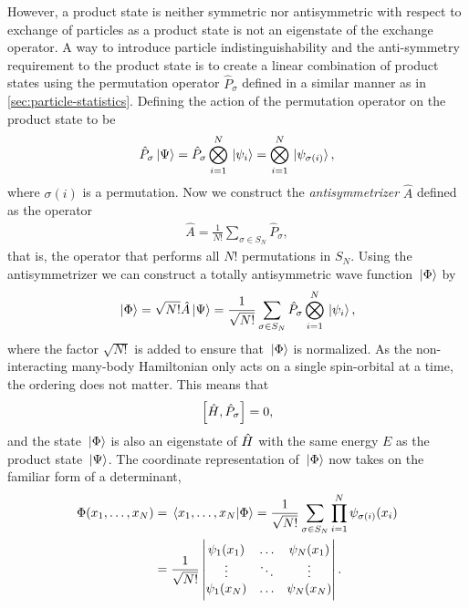         However, a product state is neither symmetric nor antisymmetric with
        respect to exchange of particles as a product state is not an eigenstate
        of the exchange operator.
        A way to introduce particle indistinguishability and the anti-symmetry
        requirement to the product state is to create a linear combination of
        product states using the permutation operator $\hat{P}_{\sigma}$ defined
        in a similar manner as in \autoref{sec:particle-statistics}.
        Defining the action of the permutation operator on the product state to
        be
        \begin{align}
            \hat{P}_{\sigma}\ket*{\Psi}
            = \hat{P}_{\sigma}\bigotimes_{i = 1}^{N}\ket*{\psi_i}
            = \bigotimes_{i = 1}^{N}\ket*{\psi_{\sigma(i)}},
        \end{align}
        where $\sigma(i)$ is a permutation.
        Now we construct the \emph{antisymmetrizer} $\hat{A}$ defined as the
        operator
        \begin{align}
            \hat{A} = \frac{1}{N!}\sum_{\sigma \in S_{N}}\hat{P}_{\sigma},
        \end{align}
        that is, the operator that performs all $N!$ permutations in $S_{N}$.
        Using the antisymmetrizer we can construct a totally antisymmetric wave
        function $\ket*{\Phi}$ by
        \begin{align}
            \ket*{\Phi}
            = \sqrt{N!}\hat{A}\ket*{\Psi}
            = \frac{1}{\sqrt{N!}}\sum_{\sigma \in S_{N}}
            \hat{P}_{\sigma}
            \bigotimes_{i = 1}^{N}\ket*{\psi_i},
            \label{eq:slater-determinant-abstract}
        \end{align}
        where the factor $\sqrt{N!}$ is added to ensure that $\ket*{\Phi}$ is
        normalized.
        As the non-interacting many-body Hamiltonian only acts on a single
        spin-orbital at a time, the ordering does not matter.
        This means that
        \begin{align}
            \left[\hat{H}, \hat{P}_{\sigma}\right] = 0,
        \end{align}
        and the state $\ket*{\Phi}$ is also an eigenstate of $\hat{H}$ with the
        same energy $E$ as the product state $\ket*{\Psi}$.
        The coordinate representation of $\ket*{\Phi}$ now takes on the familiar
        form of a determinant,
        \begin{align}
            \Phi(x_1, \dots, x_N)
            &=
            \braket*{x_1, \dots, x_N}{\Phi}
            = \frac{1}{\sqrt{N!}}
            \sum_{\sigma \in S_{N}}
            \prod_{i = 1}^{N}
            \psi_{\sigma(i)}(x_i)
            \\
            &=
            \frac{1}{\sqrt{N!}}
            \begin{vmatrix}
                \psi_1(x_1) & \dots & \psi_N(x_1) \\
                \vdots & \ddots & \vdots \\
                \psi_1(x_N) & \dots & \psi_N(x_N)
            \end{vmatrix}.
            \label{eq:coord_slater}
        \end{align}

